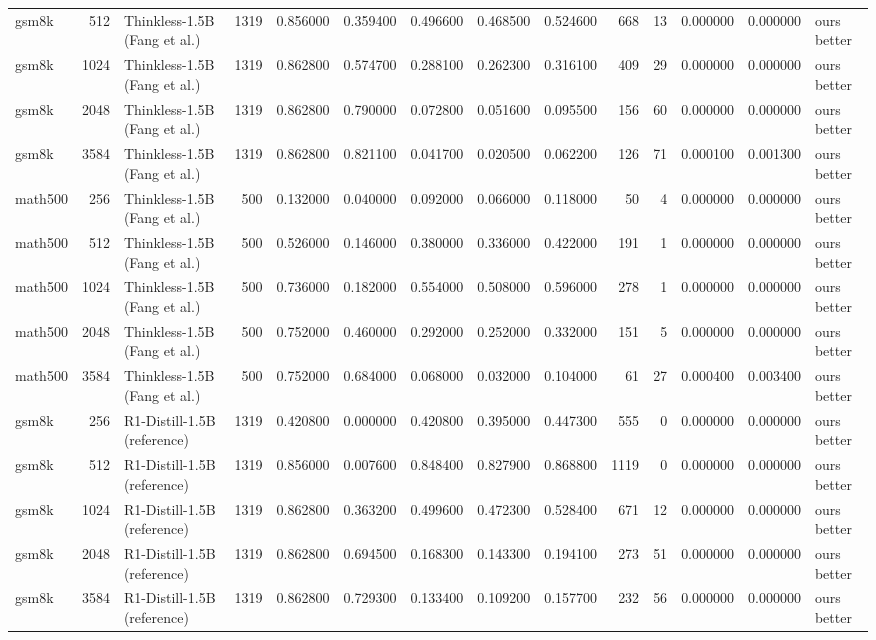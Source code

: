 \begin{table}
\begin{tabular}{lrlrrrrrrrrrrl}
gsm8k & 512 & Thinkless-1.5B (Fang et al.) & 1319 & 0.856000 & 0.359400 & 0.496600 & 0.468500 & 0.524600 & 668 & 13 & 0.000000 & 0.000000 & ours better \\
gsm8k & 1024 & Thinkless-1.5B (Fang et al.) & 1319 & 0.862800 & 0.574700 & 0.288100 & 0.262300 & 0.316100 & 409 & 29 & 0.000000 & 0.000000 & ours better \\
gsm8k & 2048 & Thinkless-1.5B (Fang et al.) & 1319 & 0.862800 & 0.790000 & 0.072800 & 0.051600 & 0.095500 & 156 & 60 & 0.000000 & 0.000000 & ours better \\
gsm8k & 3584 & Thinkless-1.5B (Fang et al.) & 1319 & 0.862800 & 0.821100 & 0.041700 & 0.020500 & 0.062200 & 126 & 71 & 0.000100 & 0.001300 & ours better \\
math500 & 256 & Thinkless-1.5B (Fang et al.) & 500 & 0.132000 & 0.040000 & 0.092000 & 0.066000 & 0.118000 & 50 & 4 & 0.000000 & 0.000000 & ours better \\
math500 & 512 & Thinkless-1.5B (Fang et al.) & 500 & 0.526000 & 0.146000 & 0.380000 & 0.336000 & 0.422000 & 191 & 1 & 0.000000 & 0.000000 & ours better \\
math500 & 1024 & Thinkless-1.5B (Fang et al.) & 500 & 0.736000 & 0.182000 & 0.554000 & 0.508000 & 0.596000 & 278 & 1 & 0.000000 & 0.000000 & ours better \\
math500 & 2048 & Thinkless-1.5B (Fang et al.) & 500 & 0.752000 & 0.460000 & 0.292000 & 0.252000 & 0.332000 & 151 & 5 & 0.000000 & 0.000000 & ours better \\
math500 & 3584 & Thinkless-1.5B (Fang et al.) & 500 & 0.752000 & 0.684000 & 0.068000 & 0.032000 & 0.104000 & 61 & 27 & 0.000400 & 0.003400 & ours better \\
gsm8k & 256 & R1-Distill-1.5B (reference) & 1319 & 0.420800 & 0.000000 & 0.420800 & 0.395000 & 0.447300 & 555 & 0 & 0.000000 & 0.000000 & ours better \\
gsm8k & 512 & R1-Distill-1.5B (reference) & 1319 & 0.856000 & 0.007600 & 0.848400 & 0.827900 & 0.868800 & 1119 & 0 & 0.000000 & 0.000000 & ours better \\
gsm8k & 1024 & R1-Distill-1.5B (reference) & 1319 & 0.862800 & 0.363200 & 0.499600 & 0.472300 & 0.528400 & 671 & 12 & 0.000000 & 0.000000 & ours better \\
gsm8k & 2048 & R1-Distill-1.5B (reference) & 1319 & 0.862800 & 0.694500 & 0.168300 & 0.143300 & 0.194100 & 273 & 51 & 0.000000 & 0.000000 & ours better \\
gsm8k & 3584 & R1-Distill-1.5B (reference) & 1319 & 0.862800 & 0.729300 & 0.133400 & 0.109200 & 0.157700 & 232 & 56 & 0.000000 & 0.000000 & ours better \\

\end{tabular}
\end{table}
